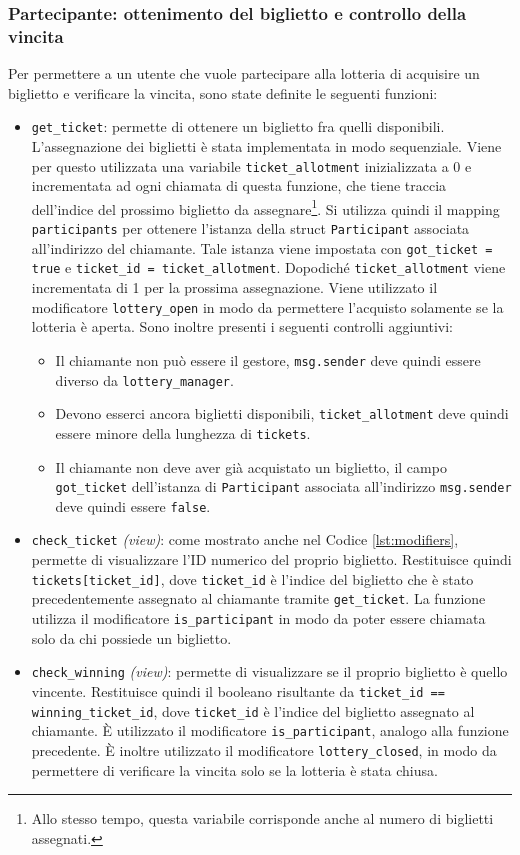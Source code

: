\documentclass[12pt,a4paper,openright,twoside]{report}
\begin{document}
\subsubsection{Partecipante: ottenimento del biglietto e controllo della vincita}
Per permettere a un utente che vuole partecipare alla lotteria di acquisire un biglietto e verificare la vincita, sono state definite le seguenti funzioni:
\begin{itemize}
    \item \texttt{get\_ticket}: permette di ottenere un biglietto fra quelli disponibili. L'assegnazione dei biglietti è stata implementata in modo sequenziale. Viene per questo utilizzata una variabile \texttt{ticket\_allotment} inizializzata a 0 e incrementata ad ogni chiamata di questa funzione, che tiene traccia dell'indice del prossimo biglietto da assegnare\footnote{Allo stesso tempo, questa variabile corrisponde anche al numero di biglietti assegnati.}. Si utilizza quindi il mapping \texttt{participants} per ottenere l'istanza della struct \texttt{Participant} associata all'indirizzo del chiamante. Tale istanza viene impostata con \texttt{got\_ticket = true} e \texttt{ticket\_id = ticket\_allotment}. Dopodiché \texttt{ticket\_allotment} viene incrementata di 1 per la prossima assegnazione. Viene utilizzato il modificatore \texttt{lottery\_open} in modo da permettere l'acquisto solamente se la lotteria è aperta. Sono inoltre presenti i seguenti controlli aggiuntivi: 
    \begin{itemize}
        \item Il chiamante non può essere il gestore, \texttt{msg.sender} deve quindi essere diverso da \texttt{lottery\_manager}.
        \item Devono esserci ancora biglietti disponibili, \texttt{ticket\_allotment} deve quindi essere minore della lunghezza di \texttt{tickets}.
        \item Il chiamante non deve aver già acquistato un biglietto, il campo \texttt{got\_ticket} dell'istanza di \texttt{Participant} associata all'indirizzo \texttt{msg.sender} deve quindi essere \texttt{false}.
    \end{itemize}
    \item \texttt{check\_ticket} \textit{(view)}: come mostrato anche nel Codice \ref{lst:modifiers}, permette di visualizzare l'ID numerico del proprio biglietto. Restituisce quindi \texttt{tickets[ticket\_id]}, dove \texttt{ticket\_id} è l'indice del biglietto che è stato precedentemente assegnato al chiamante tramite \texttt{get\_ticket}. La funzione utilizza il modificatore \texttt{is\_participant} in modo da poter essere chiamata solo da chi possiede un biglietto.
    \item \texttt{check\_winning} \textit{(view)}: permette di visualizzare se il proprio biglietto è quello vincente. Restituisce quindi il booleano risultante da \texttt{ticket\_id == winning\_ticket\_id}, dove \texttt{ticket\_id} è l'indice del biglietto assegnato al chiamante. È utilizzato il modificatore \texttt{is\_participant}, analogo alla funzione precedente. È inoltre utilizzato il modificatore \texttt{lottery\_closed}, in modo da permettere di verificare la vincita solo se la lotteria è stata chiusa. 
\end{itemize}
\end{document}
